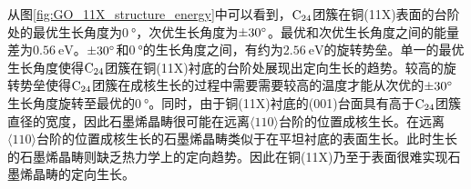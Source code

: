 从图\ref{fig:GO_11X_structure_energy}中可以看到，$\rm{C_{24}}$团簇在铜(11X)表面的台阶处的最优生长角度为$\SI{0}{\degree}$，次优生长角度为$\SI{\pm 30 }{\degree}$。最优和次优生长角度之间的能量差为$\SI{0.56 }{\electronvolt}$。$\SI{\pm 30 }{\degree}$和$\SI{0}{\degree}$的生长角度之间，有约为$\SI{2.56}{\electronvolt}$的旋转势垒。单一的最优生长角度使得$\rm{C_{24}}$团簇在铜(11X)衬底的台阶处展现出定向生长的趋势。较高的旋转势垒使得$\rm{C_{24}}$团簇在成核生长的过程中需要需要较高的温度才能从次优的$\SI{\pm 30 }{\degree}$生长角度旋转至最优的$\SI{0 }{\degree}$。同时，由于铜(11X)衬底的(001)台面具有高于$\rm{C_{24}}$团簇直径的宽度，因此石墨烯晶畴很可能在远离$\langle 110\rangle$台阶的位置成核生长。在远离$\langle 110\rangle$台阶的位置成核生长的石墨烯晶畴类似于在平坦衬底的表面生长。此时生长的石墨烯晶畴则缺乏热力学上的定向趋势。因此在铜(11X)乃至于表面很难实现石墨烯晶畴的定向生长。

